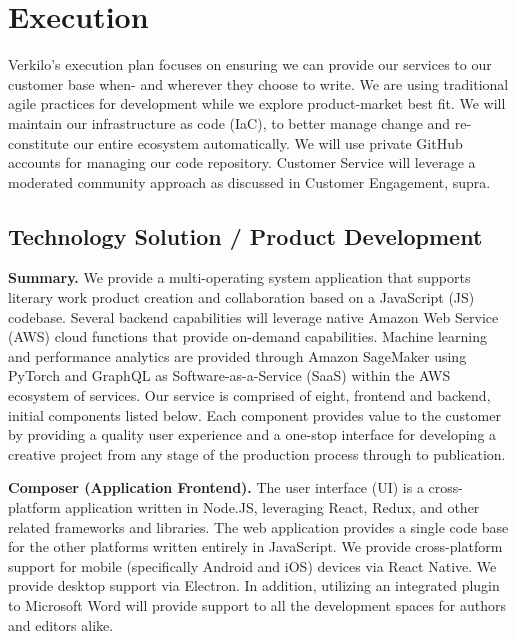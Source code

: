 \documentclass[11pt,openany]{book}
\begin{document}
\hypertarget{execution}{%
\chapter{Execution}\label{execution}}

Verkilo's execution plan focuses on ensuring we can provide our services
to our customer base when- and wherever they choose to write. We are
using traditional agile practices for development while we explore
product-market best fit. We will maintain our infrastructure as code
(IaC), to better manage change and re-constitute our entire ecosystem
automatically. We will use private GitHub accounts for managing our code
repository. Customer Service will leverage a moderated community
approach as discussed in Customer Engagement, supra.

\hypertarget{technology-solution-product-development}{%
\section{Technology Solution / Product
Development}\label{technology-solution-product-development}}

\textbf{Summary.} We provide a multi-operating system application that
supports literary work product creation and collaboration based on a
JavaScript (JS) codebase. Several backend capabilities will leverage
native Amazon Web Service (AWS) cloud functions that provide on-demand
capabilities. Machine learning and performance analytics are provided
through Amazon SageMaker using PyTorch and GraphQL as
Software-as-a-Service (SaaS) within the AWS ecosystem of services. Our
service is comprised of eight, frontend and backend, initial components
listed below. Each component provides value to the customer by providing
a quality user experience and a one-stop interface for developing a
creative project from any stage of the production process through to
publication.

\textbf{Composer (Application Frontend).} The user interface (UI) is a
cross-platform application written in Node.JS, leveraging React, Redux,
and other related frameworks and libraries. The web application provides
a single code base for the other platforms written entirely in
JavaScript. We provide cross-platform support for mobile (specifically
Android and iOS) devices via React Native. We provide desktop support
via Electron. In addition, utilizing an integrated plugin to Microsoft
Word will provide support to all the development spaces for authors and
editors alike.
\end{document}
